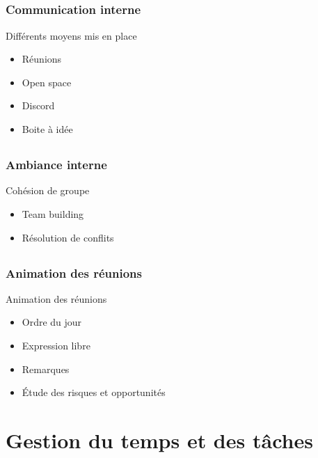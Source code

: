 \documentclass[compress,xcolor=dvipsnames]{beamer}
\begin{document}
\subsection{}
\begin{frame}
\frametitle{Communication interne}
\begin{block}{Différents moyens mis en place}
\begin{itemize}
	\item Réunions
	\item Open space
	\item Discord
	\item Boite à idée
\end{itemize}
\end{block}
\end{frame}


\subsection{}
\begin{frame}
\frametitle{Ambiance interne}
\begin{block}{Cohésion de groupe}
\begin{itemize}
	\item Team building
	\item Résolution de conflits
\end{itemize}
\end{block}
\end{frame}


\subsection{}
\begin{frame}
\frametitle{Animation des réunions}
\begin{block}{Animation des réunions}
\begin{itemize}
	\item Ordre du jour
	\item Expression libre
	\item Remarques
	\item Étude des risques et opportunités
\end{itemize}
\end{block}
\end{frame}



\section{Gestion du temps et des tâches}
\end{document}
